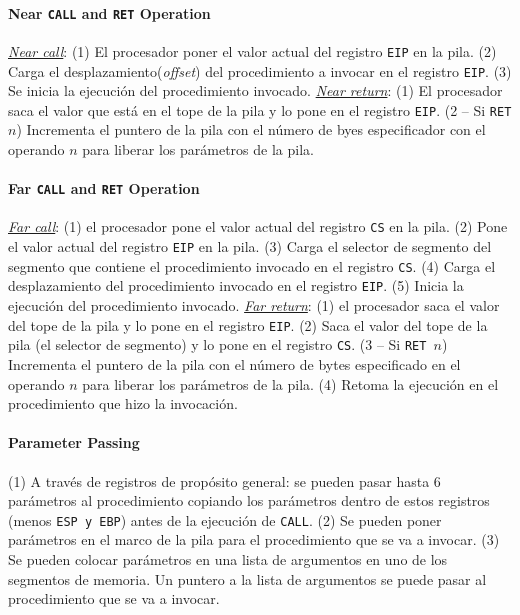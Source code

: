 \paragraph{Near \texttt{CALL} and \texttt{RET} Operation}
\underline{\textit{Near call}}: (1) El procesador poner el valor actual del registro \texttt{EIP} en la pila. (2) Carga el desplazamiento(\textit{offset}) del procedimiento a invocar en el registro \texttt{EIP}. (3) Se inicia la ejecución del procedimiento invocado. \underline{\textit{Near return}}: (1) El procesador saca el valor que está en el tope de la pila y lo pone en el registro \texttt{EIP}. (2 -- Si \texttt{RET $n$}) Incrementa el puntero de la pila con el número de byes especificador con el operando $n$ para liberar los parámetros de la pila.

\paragraph{Far \texttt{CALL} and \texttt{RET} Operation}
\underline{\textit{Far call}}: (1) el procesador pone el valor actual del registro \texttt{CS} en la pila. (2) Pone el valor actual del registro \texttt{EIP} en la pila. (3) Carga el selector de segmento del segmento que contiene el procedimiento invocado en el registro \texttt{CS}. (4) Carga el desplazamiento del procedimiento invocado en el registro \texttt{EIP}. (5) Inicia la ejecución del procedimiento invocado. \underline{\textit{Far return}}: (1) el procesador saca el valor del tope de la pila y lo pone en el registro \texttt{EIP}. (2) Saca el valor del tope de la pila (el selector de segmento) y lo pone en el registro \texttt{CS}. (3 -- Si \texttt{RET $n$}) Incrementa el puntero de la pila con el número de bytes especificado en el operando $n$ para liberar los parámetros de la pila. (4) Retoma la ejecución en el procedimiento que hizo la invocación.

\paragraph{Parameter Passing}
(1) A través de registros de propósito general: se pueden pasar hasta 6 parámetros al procedimiento copiando los parámetros dentro de estos registros (menos \texttt{ESP \textnormal{y} EBP}) antes de la ejecución de \texttt{CALL}. (2) Se pueden poner parámetros en el marco de la pila para el procedimiento que se va a invocar. (3) Se pueden colocar parámetros en una lista de argumentos en uno de los segmentos de memoria. Un puntero a la lista de argumentos se puede pasar al procedimiento que se va a invocar.


